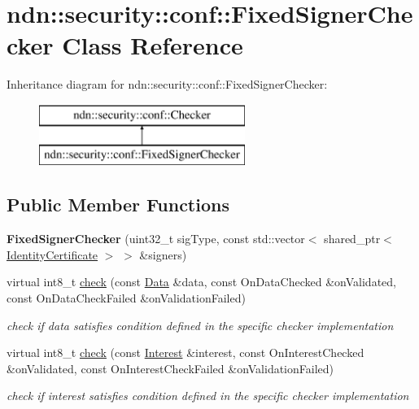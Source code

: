 \hypertarget{classndn_1_1security_1_1conf_1_1FixedSignerChecker}{}\section{ndn\+:\+:security\+:\+:conf\+:\+:Fixed\+Signer\+Checker Class Reference}
\label{classndn_1_1security_1_1conf_1_1FixedSignerChecker}
Inheritance diagram for ndn\+:\+:security\+:\+:conf\+:\+:Fixed\+Signer\+Checker\+:\begin{figure}[H]
\begin{center}
\leavevmode
\includegraphics[height=2.000000cm]{classndn_1_1security_1_1conf_1_1FixedSignerChecker}
\end{center}
\end{figure}
\subsection*{Public Member Functions}
\begin{DoxyCompactItemize}
\item 
{\bfseries Fixed\+Signer\+Checker} (uint32\+\_\+t sig\+Type, const std\+::vector$<$ shared\+\_\+ptr$<$ \hyperlink{classndn_1_1IdentityCertificate}{Identity\+Certificate} $>$ $>$ \&signers)\hypertarget{classndn_1_1security_1_1conf_1_1FixedSignerChecker_a747df6f77152f3374e2109d9944c0cac}{}\label{classndn_1_1security_1_1conf_1_1FixedSignerChecker_a747df6f77152f3374e2109d9944c0cac}

\item 
virtual int8\+\_\+t \hyperlink{classndn_1_1security_1_1conf_1_1FixedSignerChecker_ab285c81cf9d21bdac01c64d9f943fd82}{check} (const \hyperlink{classndn_1_1Data}{Data} \&data, const On\+Data\+Checked \&on\+Validated, const On\+Data\+Check\+Failed \&on\+Validation\+Failed)
\begin{DoxyCompactList}\small\item\em check if data satisfies condition defined in the specific checker implementation \end{DoxyCompactList}\item 
virtual int8\+\_\+t \hyperlink{classndn_1_1security_1_1conf_1_1FixedSignerChecker_a2f90ad1706711e7fed52efd326456dd5}{check} (const \hyperlink{classndn_1_1Interest}{Interest} \&interest, const On\+Interest\+Checked \&on\+Validated, const On\+Interest\+Check\+Failed \&on\+Validation\+Failed)
\begin{DoxyCompactList}\small\item\em check if interest satisfies condition defined in the specific checker implementation \end{DoxyCompactList}\end{DoxyCompactItemize}
